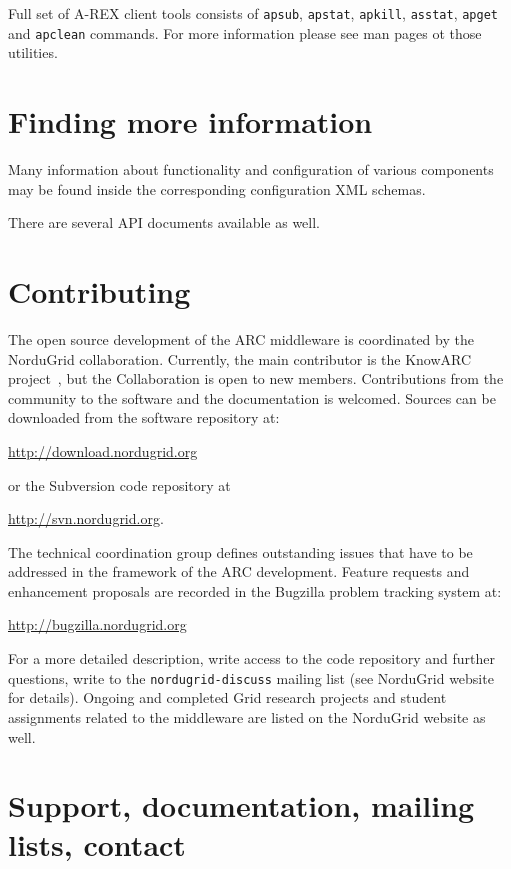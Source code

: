 \documentclass{article}                            %
\begin{document}
Full set of A-REX client tools consists of \texttt{apsub}, \texttt{apstat},
\texttt{apkill}, \texttt{asstat}, \texttt{apget} and \texttt{apclean} commands.
For more information please see man pages ot those utilities.

\section{Finding more information}
\label{sec:more-info}

Many information about functionality and configuration of various components
may be found inside the corresponding configuration XML schemas.

There are several API documents available as well.

\section{Contributing}
\label{sec:contributing}

The open source development of the ARC middleware is coordinated by the
NorduGrid collaboration. Currently, the main contributor is the KnowARC
project~\cite{knowarc}, but the Collaboration is open to new members.
Contributions from the community to the software and the documentation is
welcomed. Sources can be downloaded from the software repository at:

\url{http://download.nordugrid.org}

or the Subversion code repository at

\url{http://svn.nordugrid.org}.

The technical coordination group defines outstanding issues that have
to be addressed in the framework of the ARC development. Feature
requests and enhancement proposals are recorded in the Bugzilla problem
tracking system at:

 \url{http://bugzilla.nordugrid.org}

For a more detailed description, write access to the code repository and
further questions, write to the \texttt{nordugrid-discuss} mailing list (see
NorduGrid website~\cite{nordugrid} for details). Ongoing and completed Grid
research projects and student assignments related to the middleware are listed
on the NorduGrid website as well.


\section{Support, documentation, mailing lists, contact}
\label{sec:support}
\end{document}

